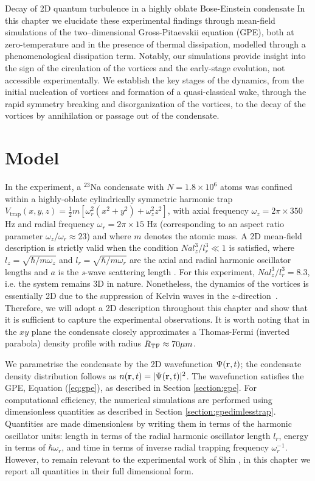 \begin{chapter}{\label{cha:shin}Decay of 2D quantum turbulence in a highly oblate Bose-Einstein condensate}
 In this chapter we elucidate these experimental
findings through mean-field simulations of the two--dimensional Gross-Pitaevskii equation (GPE), both at zero-temperature and in the presence of 
thermal dissipation, modelled through a phenomenological dissipation term.  Notably, our simulations provide insight into the sign of the circulation of the vortices and the early-stage evolution, not accessible experimentally.  We establish the key stages of the dynamics, from the initial nucleation of vortices and formation of a quasi-classical wake, through the rapid symmetry breaking and disorganization of the vortices, to the decay of the vortices by annihilation or passage out of the condensate.  

\section{Model}
In the experiment, a $^{23}$Na condensate with $N=1.8\times 10^6$ atoms was confined within a highly-oblate cylindrically symmetric harmonic trap $V_{\mathrm{trap}}(x,y,z)=\frac{1}{2}m[\omega_r^2 (x^2+y^2) +\omega_z^2 z^2 ]$, with axial frequency $\omega_z=2 \pi \times 350$ Hz and radial frequency $\omega_r=2\pi \times 15$ Hz (corresponding to an aspect ratio parameter $\omega_z/\omega_r \approx 23$) and where $m$ denotes the atomic mass.  
A 2D mean-field description is strictly valid when 
the condition $N a l_z^3/l_r^3 \ll 1$ is satisfied, 
where $l_z=\sqrt{\hbar/m \omega_z}$ and $l_r=\sqrt{\hbar/m\omega_r}$ 
are the axial and radial harmonic oscillator lengths and $a$ is 
the {\it s}-wave scattering length \cite{delgado,parker2008}.  
For this experiment, $N a l_z^3/l_r^3=8.3$, i.e. the system remains 
3D in nature.   Nonetheless, the dynamics of the vortices is essentially 2D 
due to the suppression of Kelvin waves in 
the $z$-direction~\citep{jackson_proukakis_09}.  
Therefore, we will adopt a 2D description throughout this chapter and 
show that it is sufficient to capture the experimental observations.  
It is worth noting that in the $xy$ plane the condensate 
closely approximates a Thomas-Fermi (inverted parabola) density 
profile with radius $R_{\rm TF}\approx70 \mu m$.

We parametrise the condensate by the 2D wavefunction $\Psi({\bf r},t)$; the condensate density distribution follows as $n({\bf r},t)=|\Psi({\bf r},t)|^2$.  The wavefunction satisfies the GPE, Equation (\ref{eq:gpe}), as described in Section \ref{section:gpe}. For computational efficiency, the numerical simulations are performed using dimensionless quantities as described in Section \ref{section:gpedimlesstrap}. Quantities are made dimensionless by writing them in terms of the harmonic oscillator units: length in terms of the radial harmonic oscillator length $l_r$, energy in terms of $\hbar\omega_r$, and time in terms of inverse radial trapping frequency $\omega_r^{-1}$. However, to remain relevant to the experimental work of Shin \etal, in this chapter we report all quantities in their full dimensional form.


\end{chapter}
